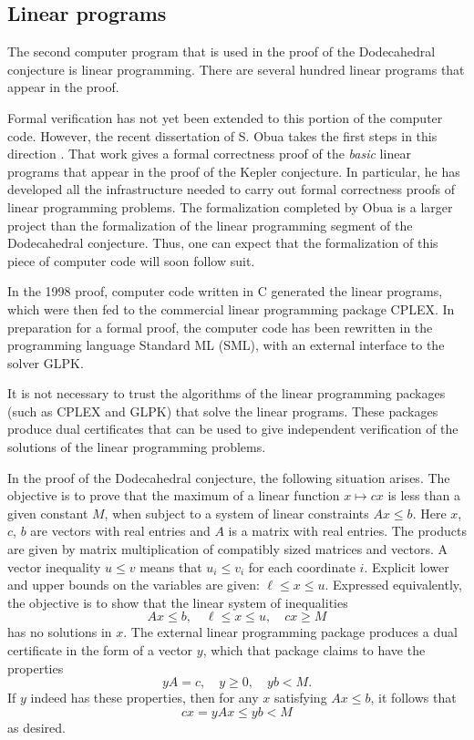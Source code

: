 \documentclass{article} %
\begin{document}

\subsection{Linear programs}

The second computer program that is used in the proof of the
Dodecahedral conjecture is linear programming. There are several
hundred linear programs that appear in the proof.

Formal verification has not yet been extended to this portion of the
computer code. However, the recent dissertation of S. Obua takes the
first steps in this direction \cite{Obua:2008:Thesis}. That work gives
a formal correctness proof of the {\it basic} linear programs that
appear in the proof of the Kepler conjecture. In particular, he has
developed all the infrastructure needed to carry out formal
correctness proofs of linear programming problems. The formalization
completed by Obua is a larger project than the formalization of the
linear programming segment of the Dodecahedral conjecture. Thus, one
can expect that the formalization of this piece of computer code will
soon follow suit.

In the 1998 proof, computer code written in C
generated the linear programs, which were then fed to the commercial
linear programming package CPLEX. In preparation for a
formal proof, the computer code has been rewritten in the programming
language Standard ML (SML), with an external
interface to the solver GLPK.

It is not necessary to trust the algorithms of the
linear programming packages (such as CPLEX and GLPK) that solve
the linear programs.  These packages produce dual certificates that
can be used to give independent verification of the solutions
of the linear programming problems.

In the proof of the Dodecahedral conjecture, the following situation
arises. The objective is to prove that the maximum of a linear
function $x\mapsto c x$ is less than a given constant $M$, when
subject to a system of linear constraints $A x \le b$. Here $x$, $c$,
$b$ are vectors with real entries and $A$ is a matrix with real
entries. The products are given by matrix multiplication of compatibly
sized matrices and vectors. A vector inequality $u\le v$ means that
$u_i \le v_i$ for each coordinate $i$. Explicit lower and upper bounds
on the variables are given: $\ell \le x \le u$. Expressed
equivalently, the objective is to show that the linear system of
inequalities
$$
A x \le b,\quad \ell \le x\le u,\quad c x \ge M
$$
has no solutions in $x$. The external linear programming package
produces a dual certificate in the form of a vector $y$, which that
package claims to have the properties
\begin{equation}
  y A = c,\quad y\ge 0,\quad y b < M.
\end{equation}
If $y$ indeed has these properties, then for any $x$ satisfying
$A x \le b$, it follows that
\begin{equation}\label{eqn:cxM}
  c x = y A x \le y b < M
\end{equation}
as desired.
\end{document}
